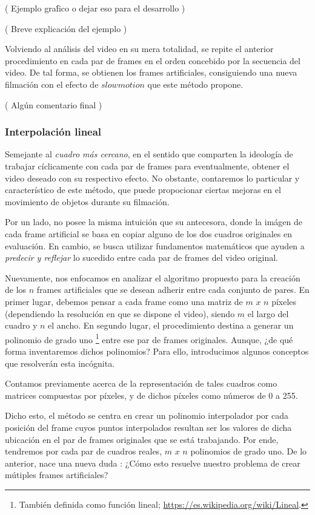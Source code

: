 ( Ejemplo gra\'fico o dejar eso para el desarrollo )

( Breve explicaci\'on del ejemplo )

Volviendo al an\'alisis del video en su mera totalidad, se repite el anterior procedimiento en cada par de frames en el orden concebido por la secuencia del video. De tal forma, se obtienen los frames artificiales, consiguiendo una nueva filmaci\'on con el efecto de $slowmotion$ que este m\'etodo propone. 

( Alg\'un comentario final )

\subsubsection{Interpolaci\'on lineal}

Semejante al \emph{cuadro m\'as cercano}, en el sentido que comparten la ideolog\'ia de trabajar c\'iclicamente con cada par de frames para eventualmente, obtener el video deseado con su respectivo efecto. No obstante, contaremos lo particular y caracter\'istico de este m\'etodo, que puede propocionar ciertas mejoras en el movimiento de objetos durante su filmaci\'on.

Por un lado, no posee la misma intuici\'on que su antecesora, donde la im\'agen de cada frame artificial se basa en copiar alguno de los dos cuadros originales en evaluaci\'on. En cambio, se busca utilizar fundamentos matem\'aticos que ayuden a \emph{predecir y reflejar} lo sucedido entre cada par de frames del video original. 

Nuevamente, nos enfocamos en analizar el algoritmo propuesto para la creaci\'on de los $n$ frames artificiales que se desean adherir entre cada conjunto de pares. En primer lugar, debemos pensar a cada frame como una matriz de $m$ $x$ $n$ p\'ixeles (dependiendo la resoluci\'on en que se dispone el video), siendo $m$ el largo del cuadro y $n$ el ancho. En segundo lugar, el procedimiento destina a generar un polinomio de grado uno \footnote{ Tambi\'en definida como funci\'on lineal; \url{https://es.wikipedia.org/wiki/Lineal}.} entre ese par de frames originales. Aunque, ¿de qu\'e forma inventaremos dichos polinomios? Para ello, introducimos algunos conceptos que resolver\'an esta inc\'ognita.

Contamos previamente acerca de la representación de tales cuadros como matrices compuestas por p\'ixeles, y de dichos píxeles como números de 0 a 255.

Dicho esto, el m\'etodo se centra en crear un polinomio interpolador por cada posici\'on del frame cuyos puntos interpolados resultan ser los valores de dicha ubicaci\'on en el par de frames originales que se est\'a trabajando. Por ende, tendremos por cada par de cuadros reales, $m$ $x$ $n$ polinomios de grado uno. De lo anterior, nace una nueva duda : ¿C\'omo esto resuelve nuestro problema de crear m\'utiples frames artificiales?

